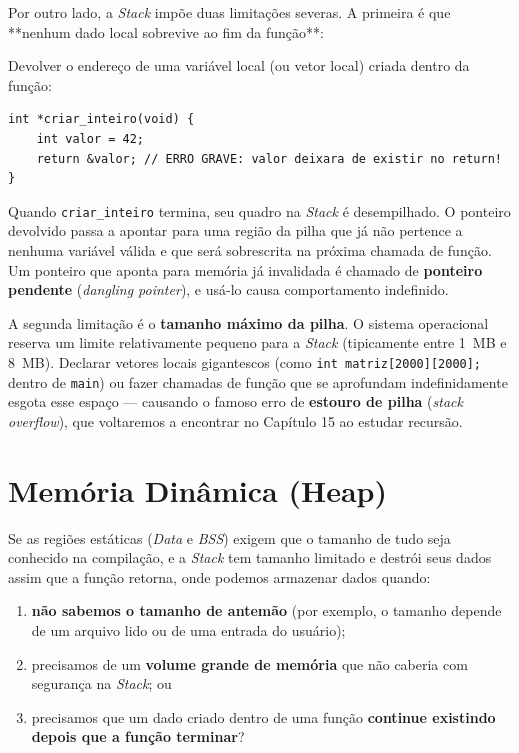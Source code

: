 Por outro lado, a \textit{Stack} impõe duas limitações severas. A primeira é que **nenhum dado local sobrevive ao fim da função**:

\begin{errocomum}
Devolver o endereço de uma variável local (ou vetor local) criada dentro da função:
\begin{lstlisting}
int *criar_inteiro(void) {
    int valor = 42;
    return &valor; // ERRO GRAVE: valor deixara de existir no return!
}
\end{lstlisting}
Quando \texttt{criar\_inteiro} termina, seu quadro na \textit{Stack} é desempilhado. O ponteiro devolvido passa a apontar para uma região da pilha que já não pertence a nenhuma variável válida e que será sobrescrita na próxima chamada de função. Um ponteiro que aponta para memória já invalidada é chamado de \textbf{ponteiro pendente} (\textit{dangling pointer}), e usá-lo causa comportamento indefinido.
\end{errocomum}

A segunda limitação é o \textbf{tamanho máximo da pilha}. O sistema operacional reserva um limite relativamente pequeno para a \textit{Stack} (tipicamente entre 1~MB e 8~MB). Declarar vetores locais gigantescos (como \texttt{int matriz[2000][2000];} dentro de \texttt{main}) ou fazer chamadas de função que se aprofundam indefinidamente esgota esse espaço — causando o famoso erro de \textbf{estouro de pilha} (\textit{stack overflow}), que voltaremos a encontrar no Capítulo 15 ao estudar recursão.

\section{Memória Dinâmica (Heap)}
\label{sec:segmento-heap}

Se as regiões estáticas (\textit{Data} e \textit{BSS}) exigem que o tamanho de tudo seja conhecido na compilação, e a \textit{Stack} tem tamanho limitado e destrói seus dados assim que a função retorna, onde podemos armazenar dados quando:

\begin{enumerate}
    \item \textbf{não sabemos o tamanho de antemão} (por exemplo, o tamanho depende de um arquivo lido ou de uma entrada do usuário);
    \item precisamos de um \textbf{volume grande de memória} que não caberia com segurança na \textit{Stack}; ou
    \item precisamos que um dado criado dentro de uma função \textbf{continue existindo depois que a função terminar}?
\end{enumerate}

